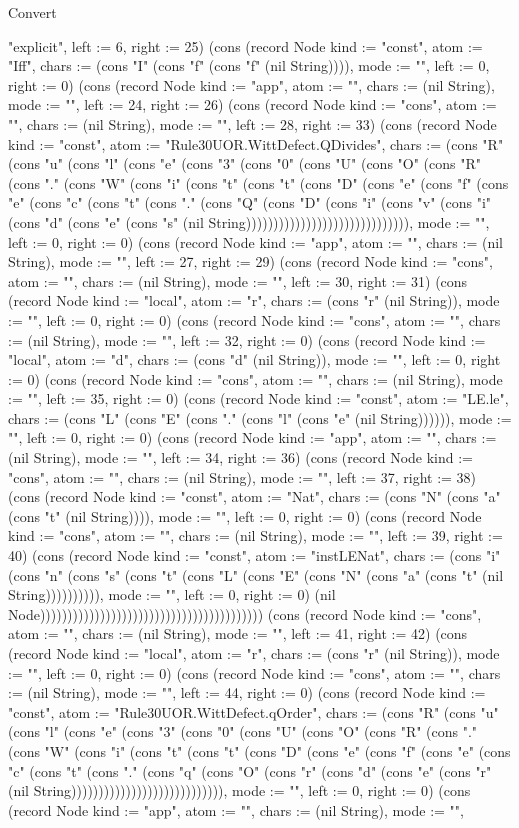 \begin{lexlean}{Convert}
\begin{semanticmodule}
{"explicit", left := 6, right := 25}) (cons (record Node {kind := "const", atom := "Iff", chars := (cons "I" (cons "f" (cons "f" (nil String)))), mode := "", left := 0, right := 0}) (cons (record Node {kind := "app", atom := "", chars := (nil String), mode := "", left := 24, right := 26}) (cons (record Node {kind := "cons", atom := "", chars := (nil String), mode := "", left := 28, right := 33}) (cons (record Node {kind := "const", atom := "Rule30UOR.WittDefect.QDivides", chars := (cons "R" (cons "u" (cons "l" (cons "e" (cons "3" (cons "0" (cons "U" (cons "O" (cons "R" (cons "." (cons "W" (cons "i" (cons "t" (cons "t" (cons "D" (cons "e" (cons "f" (cons "e" (cons "c" (cons "t" (cons "." (cons "Q" (cons "D" (cons "i" (cons "v" (cons "i" (cons "d" (cons "e" (cons "s" (nil String)))))))))))))))))))))))))))))), mode := "", left := 0, right := 0}) (cons (record Node {kind := "app", atom := "", chars := (nil String), mode := "", left := 27, right := 29}) (cons (record Node {kind := "cons", atom := "", chars := (nil String), mode := "", left := 30, right := 31}) (cons (record Node {kind := "local", atom := "r", chars := (cons "r" (nil String)), mode := "", left := 0, right := 0}) (cons (record Node {kind := "cons", atom := "", chars := (nil String), mode := "", left := 32, right := 0}) (cons (record Node {kind := "local", atom := "d", chars := (cons "d" (nil String)), mode := "", left := 0, right := 0}) (cons (record Node {kind := "cons", atom := "", chars := (nil String), mode := "", left := 35, right := 0}) (cons (record Node {kind := "const", atom := "LE.le", chars := (cons "L" (cons "E" (cons "." (cons "l" (cons "e" (nil String)))))), mode := "", left := 0, right := 0}) (cons (record Node {kind := "app", atom := "", chars := (nil String), mode := "", left := 34, right := 36}) (cons (record Node {kind := "cons", atom := "", chars := (nil String), mode := "", left := 37, right := 38}) (cons (record Node {kind := "const", atom := "Nat", chars := (cons "N" (cons "a" (cons "t" (nil String)))), mode := "", left := 0, right := 0}) (cons (record Node {kind := "cons", atom := "", chars := (nil String), mode := "", left := 39, right := 40}) (cons (record Node {kind := "const", atom := "instLENat", chars := (cons "i" (cons "n" (cons "s" (cons "t" (cons "L" (cons "E" (cons "N" (cons "a" (cons "t" (nil String)))))))))), mode := "", left := 0, right := 0}) (nil Node))))))))))))))))))))))))))))))))))))))))) (cons (record Node {kind := "cons", atom := "", chars := (nil String), mode := "", left := 41, right := 42}) (cons (record Node {kind := "local", atom := "r", chars := (cons "r" (nil String)), mode := "", left := 0, right := 0}) (cons (record Node {kind := "cons", atom := "", chars := (nil String), mode := "", left := 44, right := 0}) (cons (record Node {kind := "const", atom := "Rule30UOR.WittDefect.qOrder", chars := (cons "R" (cons "u" (cons "l" (cons "e" (cons "3" (cons "0" (cons "U" (cons "O" (cons "R" (cons "." (cons "W" (cons "i" (cons "t" (cons "t" (cons "D" (cons "e" (cons "f" (cons "e" (cons "c" (cons "t" (cons "." (cons "q" (cons "O" (cons "r" (cons "d" (cons "e" (cons "r" (nil String)))))))))))))))))))))))))))), mode := "", left := 0, right := 0}) (cons (record Node {kind := "app", atom := "", chars := (nil String), mode := "", }
\end{semanticmodule}
\end{lexlean}
